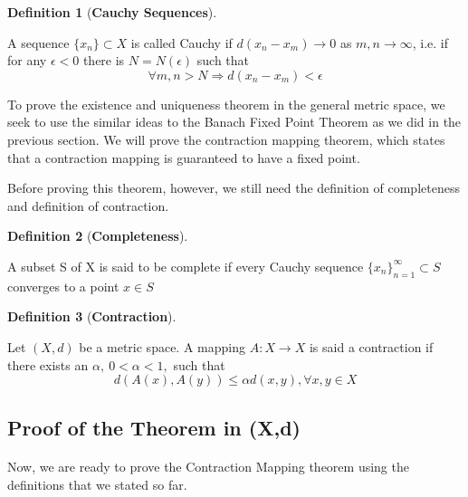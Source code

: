 \documentclass{article}
\theoremstyle{definition}
\newtheorem{definition}{Definition}[section]
\theoremstyle{remark}
\theoremstyle{example}
\begin{document}
\begin{definition}[\textbf{Cauchy Sequences}]\label{def:cauchySeq}

    A sequence $\{x_n\} \subset X$ is called Cauchy if $d(x_n - x_m) \rightarrow 0$ as $m,n \rightarrow \infty$, i.e. if for any $\epsilon < 0$ there is $N = N(\epsilon)$ such that
        \begin{equation}
            \forall m,n > N \Longrightarrow d(x_n - x_m) < \epsilon
        \end{equation}
\end{definition}

To prove the existence and uniqueness theorem in the general metric space, we seek to use the similar ideas to the Banach Fixed Point Theorem as we did in the previous section. We will prove the contraction mapping theorem, which states that a contraction mapping is guaranteed to have a fixed point.

Before proving this theorem, however, we still need the definition of completeness and definition of contraction.

\begin{definition}[\textbf{Completeness}]\label{def:completeness}

    A subset S of X is said to be complete if every Cauchy sequence $\{x_n\}_{n = 1}^{\infty} \subset S$ converges to a point $x \in S$
\end{definition}

\begin{definition}[\textbf{Contraction}]\label{def:contraction}

    Let $(X,d)$ be a metric space. A mapping $A :X\rightarrow X$ is said a contraction if there exists an $\alpha,\ 0<\alpha<1,$ such that
        \begin{equation}
            d(A(x),A(y)) \leq \alpha d(x,y), \forall x,y \in X
        \end{equation}
\end{definition}

\subsection{Proof of the Theorem in (X,d)}

\paragraph{  }

Now, we are ready to prove the Contraction Mapping theorem using the definitions that we stated so far.
\end{document}
